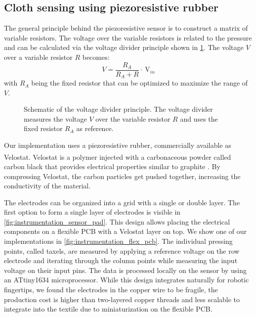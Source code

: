 \documentclass[\home/main.tex]{subfiles}
\begin{document}
\subsection{Cloth sensing using piezoresistive rubber}

The general principle behind the piezoresistive sensor is to construct a matrix of variable resistors. The voltage over the variable resistors is related to the pressure and can be calculated via the voltage divider principle shown in \cref{fig:instrumentation_voltage_divider}. The voltage $V$ over a variable resistor $R$ becomes:
\begin{equation}
    V=\frac{R_{A}}{R_{A}+R} \cdot \mathrm{~V}_{in}
\end{equation}
with $R_A$ being the fixed resistor that can be optimized to maximize the range of $V$.
\begin{figure}[htpb]
    \centering
    
    \caption[Schematic of the voltage divider principle.]{Schematic of the voltage divider principle. The voltage divider measures the voltage $V$ over the variable resistor $R$ and uses the fixed resistor $R_A$ as reference.}
    \label{fig:instrumentation_voltage_divider}
\end{figure}

Our implementation uses a piezoresistive rubber, commercially available as Velostat\textsuperscript{\textregistered}. Velostat is a polymer injected with a carbonaceous powder called carbon black that provides electrical properties similar to graphite \autocite{Dzedzickis2020}. By compressing Velostat, the carbon particles get pushed together, increasing the conductivity of the material.

The electrodes can be organized into a grid with a single or double layer.
The first option to form a single layer of electrodes is visible in \cref{fig:instrumentation_sensor_pad}. This design allows placing the electrical components on a flexible PCB with a Velostat layer on top. We show one of our implementations in \cref{fig:instrumentation_flex_pcb}. The individual pressing points, called taxels, are measured by applying a reference voltage on the row electrode and iterating through the column points while measuring the input voltage on their input pins. The data is processed locally on the sensor by using an ATtiny1634 microprocessor. While this design integrates naturally for robotic fingertips, we found the electrodes in the copper wire to be fragile, the production cost is higher than two-layered copper threads and less scalable to integrate into the textile due to miniaturization on the flexible PCB.
\end{document}
